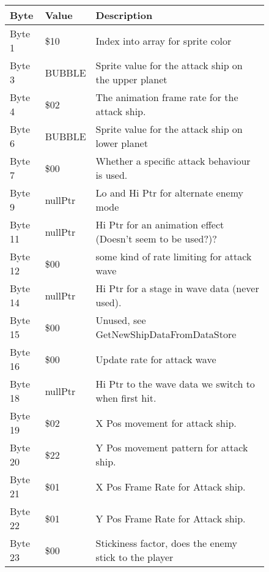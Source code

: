 \begin{figure}[H]
{\begin{adjustbox}{width=12cm}
\begin{tabular}{lll}
\toprule
 Byte    & Value              & Description                                                        \\
\midrule
 Byte 1  & \$10                & Index into array for sprite color                                  \\
 Byte 3  & BUBBLE             & Sprite value for the attack ship on the upper planet               \\
 Byte 4  & \$02                & The animation frame rate for the attack ship.                      \\
 Byte 6  & BUBBLE             & Sprite value for the attack ship on lower planet                   \\
 Byte 7  & \$00                & Whether a specific attack behaviour is used.                       \\
 Byte 9  & nullPtr            & Lo and Hi Ptr for alternate enemy mode                             \\
 Byte 11 & nullPtr            & Hi Ptr for an animation effect (Doesn't seem to be used?)?         \\
 Byte 12 & \$00                & some kind of rate limiting for attack wave                         \\
 Byte 14 & nullPtr            & Hi Ptr for a stage in wave data (never used).                      \\
 Byte 15 & \$00                & Unused, see GetNewShipDataFromDataStore                            \\
 Byte 16 & \$00                & Update rate for attack wave                                        \\
 Byte 18 & nullPtr            & Hi Ptr to the wave data we switch to when first hit.               \\
 Byte 19 & \$02                & X Pos movement for attack ship.                                    \\
 Byte 20 & \$22                & Y Pos movement pattern for attack ship.                            \\
 Byte 21 & \$01                & X Pos Frame Rate for Attack ship.                                  \\
 Byte 22 & \$01                & Y Pos Frame Rate for Attack ship.                                  \\
 Byte 23 & \$00                & Stickiness factor, does the enemy stick to the player              \\

\end{tabular}
\end{adjustbox}}
\end{figure}
